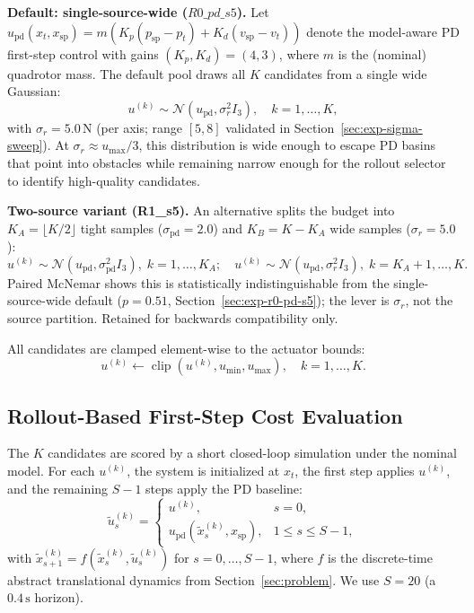 \documentclass[11pt,onecolumn,a4paper]{article}
\newcommand{\spt}{\mathrm{sp}}
\newcommand{\pd}{\mathrm{pd}}
\begin{document}
\textbf{Default: single-source-wide ($R0\_pd\_s5$).} Let
$u_\pd(x_t, x_\spt) = m (K_p (p_\spt - p_t) + K_d (v_\spt - v_t))$
denote the model-aware PD first-step control with gains
$(K_p, K_d) = (4, 3)$, where $m$ is the (nominal) quadrotor mass.
The default pool draws all $K$ candidates from a single wide Gaussian:
\begin{equation}\label{eq:srcA}
u^{(k)} \sim \mathcal{N}(u_\pd, \sigma_r^2 I_3),\quad k = 1, \ldots, K,
\end{equation}
with $\sigma_r = 5.0\,\mathrm{N}$ (per axis; range $[5, 8]$
validated in Section~\ref{sec:exp-sigma-sweep}). At $\sigma_r \approx
u_{\max}/3$, this distribution is wide enough to escape PD basins that
point into obstacles while remaining narrow enough for the rollout
selector to identify high-quality candidates.

\textbf{Two-source variant (R1\_s5).} An alternative splits the budget
into $K_A = \lfloor K/2 \rfloor$ tight samples ($\sigma_\pd = 2.0$) and
$K_B = K - K_A$ wide samples ($\sigma_r = 5.0$):
\begin{equation}\label{eq:srcB}
u^{(k)} \sim \mathcal{N}(u_\pd, \sigma_\pd^2 I_3),\; k = 1, \ldots, K_A;\quad
u^{(k)} \sim \mathcal{N}(u_\pd, \sigma_r^2 I_3),\; k = K_A{+}1, \ldots, K.
\end{equation}
Paired McNemar shows this is statistically indistinguishable from the
single-source-wide default ($p = 0.51$,
Section~\ref{sec:exp-r0-pd-s5}); the lever is $\sigma_r$, not the
source partition. Retained for backwards compatibility only.

All candidates are clamped element-wise to the actuator bounds:
\begin{equation}\label{eq:clip}
u^{(k)} \leftarrow \operatorname{clip}(u^{(k)}, u_{\min}, u_{\max}),
\quad k = 1, \ldots, K.
\end{equation}

\subsection{Rollout-Based First-Step Cost Evaluation}

The $K$ candidates are scored by a short closed-loop simulation under
the nominal model. For each $u^{(k)}$, the system is initialized at
$x_t$, the first step applies $u^{(k)}$, and the remaining $S - 1$
steps apply the PD baseline:
\begin{equation}\label{eq:rollout}
\tilde{u}_s^{(k)} =
\begin{cases}
u^{(k)}, & s = 0, \\
u_\pd(\tilde{x}_s^{(k)}, x_\spt), & 1 \le s \le S-1,
\end{cases}
\end{equation}
with $\tilde{x}_{s+1}^{(k)} = f(\tilde{x}_s^{(k)}, \tilde{u}_s^{(k)})$
for $s = 0, \ldots, S-1$, where $f$ is the discrete-time abstract
translational dynamics from Section~\ref{sec:problem}. We use $S = 20$
(a $0.4\,\mathrm{s}$ horizon).
\end{document}
